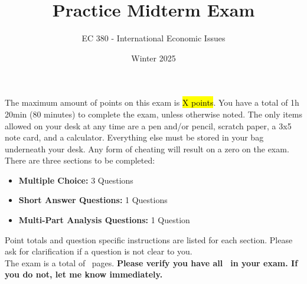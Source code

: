 \documentclass[12pt]{exam}
\title{Practice Midterm Exam}
\author{EC 380 - International Economic Issues}
\date{Winter 2025}
\begin{document}
\begin{coverpages}

\maketitle

\begin{center}
\end{center}
\vspace{2cm}

\vspace{1cm}
\noindent
The maximum amount of points on this exam is \hl{X points}. 
You have a total of 1h 20min (80 minutes) to complete the exam, unless otherwise noted. 
The only items allowed on your desk at any time are a pen and/or pencil, scratch paper, a 3x5 note card, and a calculator. 
Everything else must be stored in your bag underneath your desk. 
Any form of cheating will result on a zero on the exam.\\

\noindent There are three sections to be completed:

\begin{itemize}
    \item \textbf{Multiple Choice:} 3 Questions
    \item \textbf{Short Answer Questions:} 1 Questions
    \item \textbf{Multi-Part Analysis Questions:} 1 Question
\end{itemize}

\noindent Point totals and question specific instructions are listed for each section.
Please ask for clarification if a question is not clear to you.\\

\noindent The exam is a total of \numpages $\,$ pages. 
\textbf{Please verify you have all \numpages $\,$ in your exam. If you do not, let me know immediately.}

\noindent 

\end{coverpages}
\end{document}
